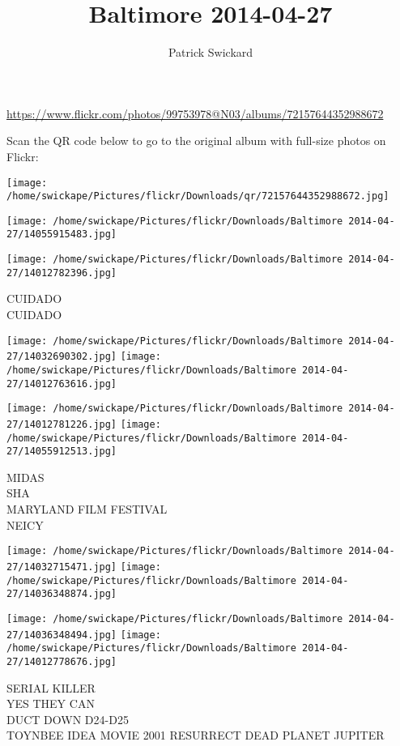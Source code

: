 \documentclass[10pt,letterpaper]{article}
\title{Baltimore 2014-04-27}
\author{Patrick Swickard}
\date{}
\begin{document}
\maketitle

\url{https://www.flickr.com/photos/99753978@N03/albums/72157644352988672}

Scan the QR code below to go to the original album with full-size photos on Flickr:

\texttt{[image: /home/swickape/Pictures/flickr/Downloads/qr/72157644352988672.jpg]}
\pagebreak

\texttt{[image: /home/swickape/Pictures/flickr/Downloads/Baltimore 2014-04-27/14055915483.jpg]}

\vspace{0.25in}
\texttt{[image: /home/swickape/Pictures/flickr/Downloads/Baltimore 2014-04-27/14012782396.jpg]}

CUIDADO\\
CUIDADO
\pagebreak

\texttt{[image: /home/swickape/Pictures/flickr/Downloads/Baltimore 2014-04-27/14032690302.jpg]}
\texttt{[image: /home/swickape/Pictures/flickr/Downloads/Baltimore 2014-04-27/14012763616.jpg]}

\texttt{[image: /home/swickape/Pictures/flickr/Downloads/Baltimore 2014-04-27/14012781226.jpg]}
\texttt{[image: /home/swickape/Pictures/flickr/Downloads/Baltimore 2014-04-27/14055912513.jpg]}

MIDAS\\
SHA\\
MARYLAND FILM FESTIVAL\\
NEICY
\pagebreak

\texttt{[image: /home/swickape/Pictures/flickr/Downloads/Baltimore 2014-04-27/14032715471.jpg]}
\texttt{[image: /home/swickape/Pictures/flickr/Downloads/Baltimore 2014-04-27/14036348874.jpg]}

\texttt{[image: /home/swickape/Pictures/flickr/Downloads/Baltimore 2014-04-27/14036348494.jpg]}
\texttt{[image: /home/swickape/Pictures/flickr/Downloads/Baltimore 2014-04-27/14012778676.jpg]}

SERIAL KILLER\\
YES THEY CAN\\
DUCT DOWN D24{-}D25\\
TOYNBEE IDEA MOVIE 2001 RESURRECT DEAD PLANET JUPITER
\pagebreak
\end{document}
